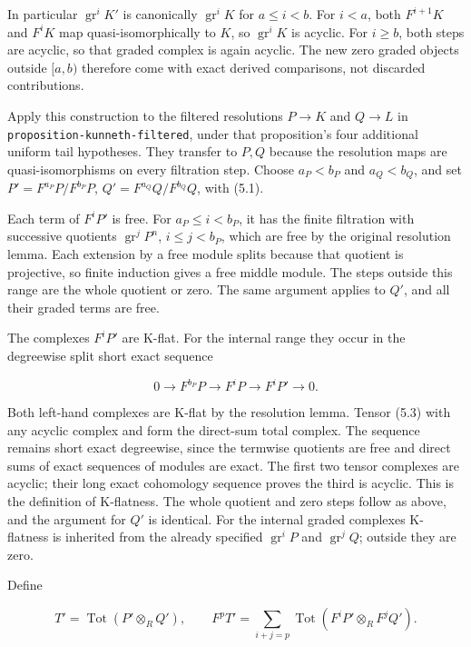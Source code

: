 In particular \(\operatorname{gr}^iK'\) is canonically \(\operatorname{gr}^iK\) for \(a\leq i<b\). For \(i<a\), both \(F^{i+1}K\) and \(F^iK\) map quasi-isomorphically to \(K\), so \(\operatorname{gr}^iK\) is acyclic. For \(i\geq b\), both steps are acyclic, so that graded complex is again acyclic. The new zero graded objects outside \([a,b)\) therefore come with exact derived comparisons, not discarded contributions.

Apply this construction to the filtered resolutions \(P\to K\) and \(Q\to L\) in \texttt{proposition-kunneth-filtered}, under that proposition's four additional uniform tail hypotheses. They transfer to \(P,Q\) because the resolution maps are quasi-isomorphisms on every filtration step. Choose \(a_P<b_P\) and \(a_Q<b_Q\), and set \(P'=F^{a_P}P/F^{b_P}P\), \(Q'=F^{a_Q}Q/F^{b_Q}Q\), with (5.1).

Each term of \(F^iP'\) is free. For \(a_P\leq i<b_P\), it has the finite filtration with successive quotients \(\operatorname{gr}^jP^n\), \(i\leq j<b_P\), which are free by the original resolution lemma. Each extension by a free module splits because that quotient is projective, so finite induction gives a free middle module. The steps outside this range are the whole quotient or zero. The same argument applies to \(Q'\), and all their graded terms are free.

The complexes \(F^iP'\) are K-flat. For the internal range they occur in the degreewise split short exact sequence

\[
0\to F^{b_P}P\to F^iP\to F^iP'\to0.          \tag{5.3}
\]

Both left-hand complexes are K-flat by the resolution lemma. Tensor (5.3) with any acyclic complex and form the direct-sum total complex. The sequence remains short exact degreewise, since the termwise quotients are free and direct sums of exact sequences of modules are exact. The first two tensor complexes are acyclic; their long exact cohomology sequence proves the third is acyclic. This is the definition of K-flatness. The whole quotient and zero steps follow as above, and the argument for \(Q'\) is identical. For the internal graded complexes K-flatness is inherited from the already specified \(\operatorname{gr}^iP\) and \(\operatorname{gr}^jQ\); outside they are zero.

Define

\[
T'=\operatorname{Tot}(P'\otimes_R Q'),\qquad
F^pT'=\sum_{i+j=p}\operatorname{Tot}(F^iP'\otimes_R F^jQ').       \tag{5.4}
\]


